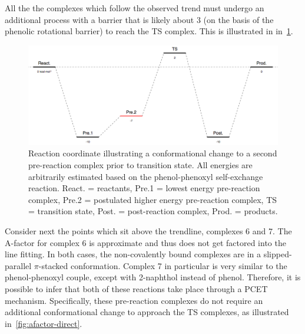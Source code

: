 All the the complexes which follow the observed trend must undergo an additional process with a barrier that is likely about 3 \kcalmol (on the basis of the phenolic rotational barrier) to reach the TS complex. This is illustrated in in~\ref{fig:afactor-trend}.

\begin{figure}[htb]
  \centering
  \includegraphics[width=\textwidth]{figures/afactor-trend.png}
  \caption[Reaction coordinate illustrating a conformational change to a second pre-reaction complex prior to transition state.]{Reaction coordinate illustrating a conformational change to a second pre-reaction complex prior to transition state. All energies are arbitrarily estimated based on the phenol-phenoxyl self-exchange reaction. React. = reactants, Pre.1 = lowest energy pre-reaction complex, Pre.2 = postulated higher energy pre-reaction complex, TS = transition state, Post. = post-reaction complex, Prod. = products.}
\label{fig:afactor-trend}
\end{figure}

Consider next the points which sit above the trendline, complexes 6 and 7. The A-factor for complex 6 is approximate and thus does not get factored into the line fitting. In both cases, the non-covalently bound complexes are in a slipped-parallel $\pi$-stacked conformation. Complex 7 in particular is very similar to the phenol-phenoxyl couple, except with 2-naphthol instead of phenol. Therefore, it is possible to infer that both of these reactions take place through a PCET mechanism. Specifically, these pre-reaction complexes do not require an additional conformational change to approach the TS complexes, as illustrated in~\ref{fig:afactor-direct}.

